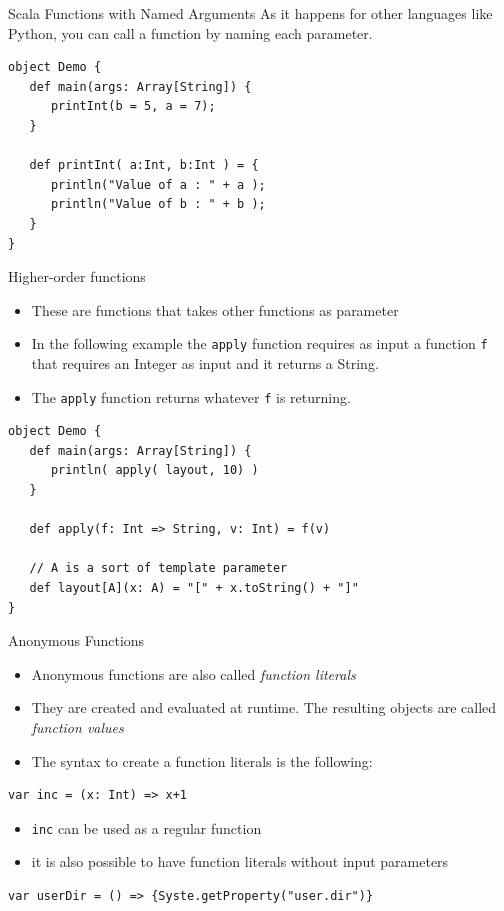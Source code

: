 \documentclass[presentation, aspectratio=169]{beamer}
\begin{document}
\begin{frame}[label={sec:org544a7c2},fragile]{Scala Functions with Named Arguments}
 As it happens for other languages like Python, you can call a function
by naming each parameter.

\begin{verbatim}
object Demo {
   def main(args: Array[String]) {
      printInt(b = 5, a = 7);
   }

   def printInt( a:Int, b:Int ) = {
      println("Value of a : " + a );
      println("Value of b : " + b );
   }
}

\end{verbatim}
\end{frame}

\begin{frame}[label={sec:org374179a},fragile]{Higher-order functions}
 \begin{itemize}
\item These are functions that takes other functions as parameter
\item In the following example the \texttt{apply} function requires as input a function \texttt{f} that requires
an Integer as input and it returns a String.

\item The \texttt{apply} function returns whatever \texttt{f} is returning.
\end{itemize}
\begin{verbatim}
object Demo {
   def main(args: Array[String]) {
      println( apply( layout, 10) )
   }

   def apply(f: Int => String, v: Int) = f(v)

   // A is a sort of template parameter
   def layout[A](x: A) = "[" + x.toString() + "]"
}
\end{verbatim}
\end{frame}

\begin{frame}[label={sec:org635c6f4},fragile]{Anonymous Functions}
 \begin{itemize}
\item Anonymous functions are also called \emph{function literals}
\item They are created and evaluated at runtime. The resulting objects are called 
\emph{function values}

\item The syntax to create a function literals is the following:
\end{itemize}
\begin{verbatim}
var inc = (x: Int) => x+1
\end{verbatim}

\begin{itemize}
\item \texttt{inc} can be used as a regular function
\item it is also possible to have function literals without input parameters
\end{itemize}
\begin{verbatim}
var userDir = () => {Syste.getProperty("user.dir")}
\end{verbatim}
\end{frame}
\end{document}
